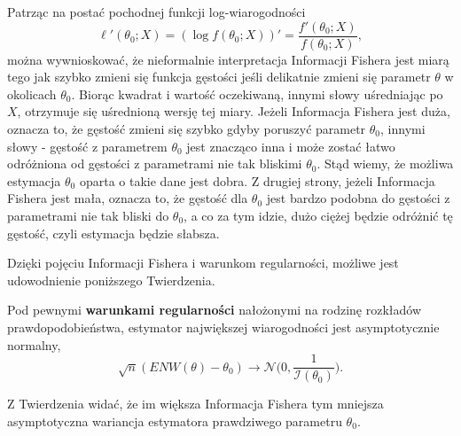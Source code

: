 \newpage
Patrząc na postać pochodnej funkcji log-wiarogodności
$$\ell'(\theta_0;X) = (\log f(\theta_0;X))' = \dfrac{f'(\theta_0;X)}{f(\theta_0;X)},$$
można wywnioskować, że nieformalnie interpretacja Informacji Fishera jest miarą tego jak szybko zmieni się funkcja gęstości jeśli delikatnie zmieni się parametr $\theta$ w okolicach $\theta_0$. Biorąc kwadrat i wartość oczekiwaną, innymi słowy uśredniając po $X$, otrzymuje się uśrednioną wersję tej miary. Jeżeli Informacja Fishera jest duża, oznacza to, że gęstość zmieni się szybko
gdyby poruszyć parametr $\theta_0$, innymi słowy - gęstość z parametrem $\theta_0$ jest
znacząco inna i może zostać łatwo odróżniona od gęstości z parametrami nie tak bliskimi $\theta_0$.
Stąd wiemy, że możliwa estymacja $\theta_0$ oparta o takie dane jest dobra. Z drugiej strony, jeżeli
Informacja Fishera jest mała, oznacza to, że gęstość dla $\theta_0$ jest bardzo podobna do gęstości z parametrami nie tak bliski do $\theta_0$, a co za tym idzie, dużo ciężej będzie odróżnić tę gęstość, czyli estymacja będzie słabsza.

Dzięki pojęciu Informacji Fishera i warunkom regularności, możliwe jest udowodnienie poniższego Twierdzenia.

\begin{theorem}
Pod pewnymi \textbf{warunkami regularności} nałożonymi na rodzinę rozkładów prawdopodobieństwa, estymator największej wiarogodności jest asymptotycznie normalny, 
$$ \sqrt{n}(ENW(\theta) - \theta_0) \rightarrow \mathcal{N}\Big(0, \dfrac{1}{\mathcal{I}(\theta_0)}\Big).$$
\end{theorem}

Z Twierdzenia widać, że im większa Informacja Fishera tym mniejsza asymptotyczna wariancja estymatora prawdziwego parametru $\theta_0$.

